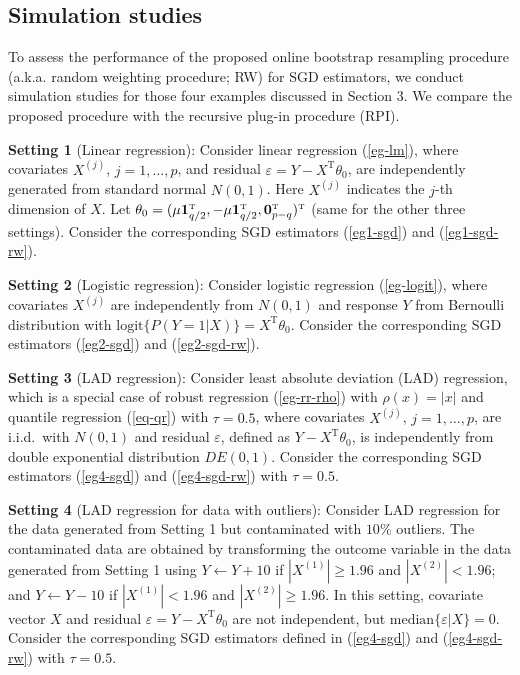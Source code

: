 \documentclass[twoside,11pt]{article}
\def\trans{^{ \mathrm{\scriptscriptstyle T} }}
\begin{document}
\subsection{Simulation studies}

To assess the performance of the proposed online bootstrap resampling procedure (a.k.a. random weighting procedure; RW) for SGD estimators, we conduct simulation studies for those four examples discussed in Section 3. We compare the proposed procedure with the recursive plug-in procedure (RPI).

{\bf Setting 1} (Linear regression):  Consider linear regression (\ref{eg-lm}), where covariates $X^{(j)}$, $j=1, \dots, p$, and residual $\varepsilon=Y-X\trans\theta_0$, are independently generated from standard normal $N(0,1)$. Here $X^{(j)}$ indicates the $j$-th dimension of $X$. Let $\theta_0=(\mu{\bf 1}\trans_{q/2},-\mu{\bf 1}\trans_{q/2},{\bf 0}\trans_{p-q})\trans$ (same for the other three settings). Consider the corresponding SGD estimators (\ref{eg1-sgd}) and (\ref{eg1-sgd-rw}).

{\bf Setting 2} (Logistic regression): Consider logistic regression (\ref{eg-logit}), where covariates $X^{(j)}$ are independently from $N(0,1)$ and response $Y$ from Bernoulli distribution with $\mbox{logit}\{P(Y=1|X)\}=X\trans\theta_0$. Consider the corresponding SGD estimators (\ref{eg2-sgd}) and (\ref{eg2-sgd-rw}).

{\bf Setting 3} (LAD regression): Consider least absolute deviation (LAD) regression, which is a special case of robust regression (\ref{eg-rr-rho}) with $\rho(x)=|x|$ and quantile regression (\ref{eq-qr}) with $\tau=0.5$, where covariates $X^{(j)}$, $j=1, \dots, p$, are i.i.d.~with $N(0, 1)$ and residual $\varepsilon$, defined as $Y-X\trans\theta_0$, is independently from double exponential distribution $DE(0, 1)$. Consider the corresponding SGD estimators (\ref{eg4-sgd}) and (\ref{eg4-sgd-rw}) with $\tau=0.5$.

{\bf Setting 4} (LAD regression for data with outliers): Consider LAD regression for the data generated from Setting 1 but contaminated with $10\%$ outliers. The contaminated data are obtained by transforming the outcome variable in the data generated from Setting 1 using $Y \leftarrow Y +10$ if $|X^{(1)}|\geq 1.96$ and $|X^{(2)}|< 1.96$; and $Y \leftarrow Y -10$ if $|X^{(1)}|< 1.96$ and $|X^{(2)}|\geq 1.96$. In this setting, covariate vector $X$ and residual $\varepsilon=Y-X\trans\theta_0$ are not independent, but $\mbox{median}\{\varepsilon|X\}=0$. Consider the corresponding SGD estimators defined in (\ref{eg4-sgd}) and (\ref{eg4-sgd-rw}) with $\tau=0.5$.
\end{document}
